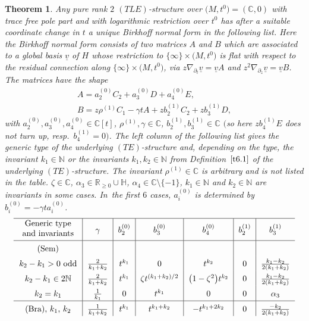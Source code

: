 \documentclass[10pt,a4paper]{amsart}
\numberwithin{equation}{section}
\numberwithin{figure}{section}
\newcommand{\N}{{\mathbb N}}
\newcommand{\C}{{\mathbb C}}
\newcommand{\R}{{\mathbb R}}
\renewcommand{\H}{{\mathbb H}}
\newcommand{\uuuu}{\underline}
\newcommand{\paa}{\partial}
\newcommand{\nnn}{\nabla}
\newtheorem{Theorem}{Theorem}[section]
\begin{document}
\begin{Theorem}\label{t6.3}
Any pure rank $2$ $(TLE)$-structure over $\big(M,t^0\big)=(\C,0)$
with trace free pole part and with logarithmic
restriction over $t^0$ has after a suitable coordinate change
in $t$ a unique Birkhoff normal form in the following list.
Here the Birkhoff normal form
consists of two matrices $A$ and $B$ which are associated
to a global basis $\uuuu{v}$ of $H$ whose restriction to
$\{\infty\}\times \big(M,t^0\big)$ is flat with
respect to the residual connection along
$\{\infty\}\times \big(M,t^0\big)$, via
$z\nnn_{\paa_t}\uuuu{v}=\uuuu{v}A$ and
\mbox{$z^2\nnn_{\paa_z}\uuuu{v}=\uuuu{v}B$}.
The matrices have the shape
\begin{gather}
A=a_2^{(0)}C_2+a_3^{(0)}D+a_4^{(0)}E,\nonumber
\\
B=z\rho^{(1)}C_1-\gamma tA
+zb_2^{(1)}C_2+zb_3^{(1)}D,\label{6.19}%
\end{gather}
with $a_2^{(0)},a_3^{(0)},a_4^{(0)}\in\C[t]$,
$\rho^{(1)},\gamma\in\C$, $b_2^{(1)},b_3^{(1)}\in\C$
$($so here $zb_4^{(1)}E$ does not turn up, resp.~$b_4^{(1)}\allowbreak=0)$.
The left column of the following list gives the
generic type of the
underlying $(TE)$-structure and, depending on the type,
the invariant $k_1\in\N$ or the invariants $k_1,k_2\in\N$
from Definition~$\ref{t6.1}$ of the underlying $(TE)$-structure.
The invariant $\rho^{(1)}\in \C$ is arbitrary and
is not listed in the table.
$\zeta\in\C$, $\alpha_3\in \R_{\geq 0}\cup\H$,
$\alpha_4\in\C\setminus \{-1\}$, $k_1\in\N$ and $k_2\in\N$
are invariants in some cases. In~the first $6$ cases, $a_i^{(0)}$ is determined by
$b_i^{(0)}=-\gamma t a_i^{(0)}$.
\[
\def\arraystretch{1.5}
\begin{tabular}{c|c|c|c|c|c|c}
\hline
\raisebox{1mm}[3.9ex][2.2ex]{\parbox[c]{25mm}{\centering Generic type and~invariants}} & $\gamma$
& $b_2^{(0)}$ & $b_3^{(0)}$ & $b_4^{(0)}$ &
$b_2^{(1)}$ & $b_3^{(1)}$
\\
\hline
$($Sem$)$ & & & & & &
\\
$k_2-k_1>0$\ odd & $\frac{2}{k_1+k_2}$ &
$t^{k_1}$ & $0$ & $t^{k_2}$ & $0$ & $\frac{k_1-k_2}{2(k_1+k_2)}$
\\
$k_2-k_1\in 2\N$& $\frac{2}{k_1+k_2}$ &
$t^{k_1}$ & $\zeta t^{(k_1+k_2)/2}$ & $\big(1-\zeta^2\big)t^{k_2}$ &
$0$ & $\frac{k_1-k_2}{2(k_1+k_2)}$
\\
$k_2=k_1$ & $\frac{1}{k_1}$ & $0$ & $t^{k_1}$ & $0$ &
$0$ & $\alpha_3$
\\
\hline
$($Bra$)$, $k_1$, $k_2$ & $\frac{1}{k_1+k_2}$ & $t^{k_1}$ &
$t^{k_1+k_2}$ & $-t^{k_1+2k_2}$ & $0$ & $\frac{-k_2}{2(k_1+k_2)}$

\end{tabular}\]
\end{Theorem}
\end{document}
